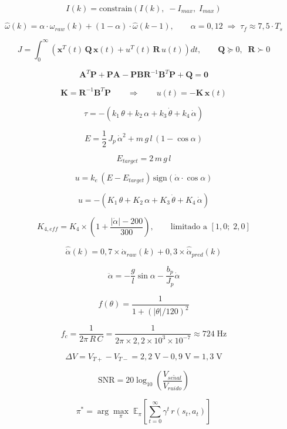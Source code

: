 \documentclass[12pt]{article}
\begin{document}
\[ I(k) = \mathrm{constrain}\!\left(I(k),\; -I_{max},\; I_{max}\right) \]

\[ \hat{\omega}(k) = \alpha \cdot \omega_{raw}(k) + (1 - \alpha) \cdot \hat{\omega}(k-1), \qquad \alpha = 0{,}12 \;\Rightarrow\; \tau_f \approx 7{,}5 \cdot T_s \]

\[ J = \int_0^{\infty} \left( \mathbf{x}^T(t) \, \mathbf{Q} \, \mathbf{x}(t) + u^T(t) \, \mathbf{R} \, u(t) \right) dt, \qquad \mathbf{Q} \succeq 0, \;\; \mathbf{R} \succ 0 \]

\[ \mathbf{A}^T \mathbf{P} + \mathbf{P} \mathbf{A} - \mathbf{P} \mathbf{B} \mathbf{R}^{-1} \mathbf{B}^T \mathbf{P} + \mathbf{Q} = \mathbf{0} \]

\[ \mathbf{K} = \mathbf{R}^{-1} \mathbf{B}^T \mathbf{P} \qquad\Longrightarrow\qquad u(t) = -\mathbf{K} \, \mathbf{x}(t) \]

\[ \tau = -(k_1 \, \theta + k_2 \, \alpha + k_3 \, \dot{\theta} + k_4 \, \dot{\alpha}) \]

\[ E = \frac{1}{2} \, J_p \, \dot{\alpha}^2 + m \, g \, l \, (1 - \cos\alpha) \]

\[ E_{target} = 2 \, m \, g \, l \]

\[ u = k_e \, (E - E_{target}) \, \mathrm{sign}(\dot{\alpha} \cdot \cos\alpha) \]

\[ u = -(K_1 \, \theta + K_2 \, \alpha + K_3 \, \dot{\theta} + K_4 \, \dot{\alpha}) \]

\[ K_{4,eff} = K_4 \times \left(1 + \frac{|\dot{\alpha}| - 200}{300}\right), \qquad \text{limitado a } [1{,}0;\; 2{,}0] \]

\[ \hat{\dot{\alpha}}(k) = 0{,}7 \times \dot{\alpha}_{raw}(k) + 0{,}3 \times \hat{\dot{\alpha}}_{pred}(k) \]

\[ \ddot{\alpha} = -\frac{g}{l}\sin\alpha - \frac{b_p}{J_p}\dot{\alpha} \]

\[ f(\theta) = \frac{1}{1 + (|\theta| / 120)^2} \]

\[ f_c = \frac{1}{2\pi \, R \, C} = \frac{1}{2\pi \times 2{,}2 \times 10^3 \times 10^{-7}} \approx 724\;\text{Hz} \]

\[ \Delta V = V_{T+} - V_{T-} = 2{,}2\;\text{V} - 0{,}9\;\text{V} = 1{,}3\;\text{V} \]

\[ \mathrm{SNR} = 20 \log_{10}\!\left( \frac{V_{se\tilde{n}al}}{V_{ruido}} \right) \]

\[ \pi^{*} = \arg\max_{\pi} \; \mathbb{E}_{\pi}\!\left[ \sum_{t=0}^{\infty} \gamma^{t} \, r(s_t, a_t) \right] \]
\end{document}
